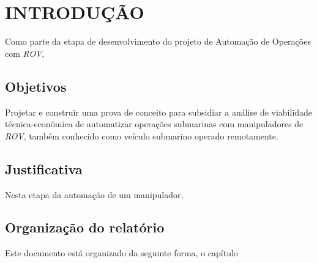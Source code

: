 \chapter{INTRODUÇÃO}
\label{chap:intro}
Como parte da etapa de desenvolvimento do projeto de Automação de Operações com \textit{\acs{ROV}}, \cite{pybullet}

\cite{sivvcev2018underwater}



\section{Objetivos}
\label{sec:obj}
Projetar e construir uma prova de conceito para subsidiar a análise de viabilidade técnica-econômica de automatizar operações submarinas com manipuladores de \textit{\acs{ROV}}, também conhecido como veículo submarino operado remotamente.


\section{Justificativa} %
\label{sec:just}
Nesta etapa da automação de um manipulador, 


\section{Organização do relatório}
\label{sec:org}
Este documento está organizado da seguinte forma, o capítulo 



